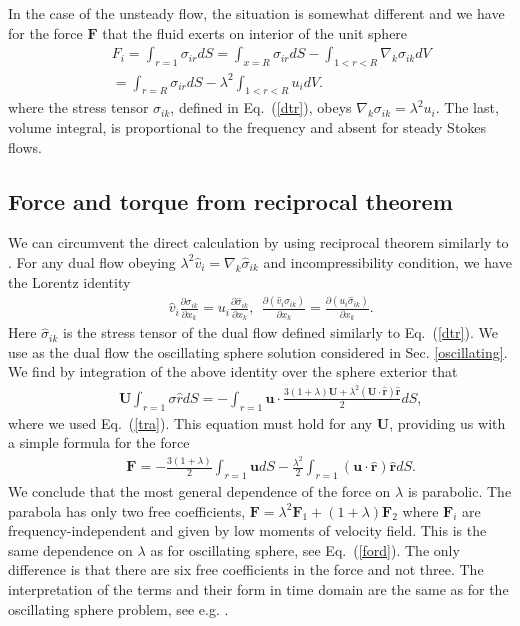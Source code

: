 \documentclass[aps,prx,twocolumn,amsmath,amssymb,amsfonts]{revtex4-2}
\begin{document}
{{\begin{appendices}
In the case of the unsteady flow, the situation is somewhat different and we have for the force $\bm F$ that the fluid exerts on interior of the unit sphere
\begin{eqnarray}&&
F_i=\int_{r=1} \sigma_{ir}dS=\int_{x=R} \sigma_{ir}dS-\int_{1<r<R} \nabla_k\sigma_{ik} dV
\nonumber\\&&
=\int_{r=R} \sigma_{ir}dS-\lambda^2 \int_{1<r<R}u_i dV. \label{fs0}
\end{eqnarray}
where the stress tensor $\sigma_{ik}$, defined in Eq.~(\ref{dtr}), obeys $\nabla_k\sigma_{ik}=\lambda^2u_i$. The last, volume integral, is proportional to the frequency and absent for steady Stokes flows.

\subsection{Force and torque from reciprocal theorem}

We can circumvent the direct calculation by using reciprocal theorem \cite{kim} similarly to \cite{for}. For any dual flow obeying $\lambda^2{\hat v}_i=\nabla_k{\hat \sigma}_{ik}$ and incompressibility condition, we have the Lorentz identity
\begin{eqnarray}&&\!\!\!\!\!\!\!\!\!\!\!\!\!
{\hat v}_i\frac{\partial \sigma_{ik}}{\partial x_k}\!=\!
u_i\frac{\partial {\hat \sigma}_{ik}}{\partial x_k},\ \ \frac{\partial ({\hat v}_i\sigma_{ik})}{\partial x_k}\!=\!
\frac{\partial (u_i{\hat \sigma}_{ik})}{\partial x_k}. \label{lorentz}
\end{eqnarray}
Here ${\hat \sigma}_{ik}$ is the stress tensor of the dual flow defined similarly to Eq.~(\ref{dtr}). We use as the dual flow the oscillating sphere solution considered in Sec. \ref{oscillating}. We find by integration of the above identity over the sphere exterior that
\begin{eqnarray}&&
\bm U\int_{r=1} \sigma{\hat r}dS=-\int_{r=1} \bm u\cdot \frac{3(1+\lambda)\bm U+\lambda^2 (\bm U\cdot \bm {\hat r})\bm {\hat r}}{2}dS,\nonumber
\end{eqnarray}
where we used Eq.~(\ref{tra}). This equation must hold for any $\bm U$, providing us with a simple formula for the force
\begin{eqnarray}&&\!\!\!\!\!\!
\bm F=-\frac{3(1+\lambda)}{2}\int_{r=1} \bm udS-\frac{\lambda^2}{2}\int_{r=1}  (\bm u\cdot \bm {\hat r})\bm {\hat r}dS. \label{sl}
\end{eqnarray}
We conclude that the most general dependence of the force on $\lambda$ is parabolic. The parabola has only two free coefficients, $\bm F=\lambda^2 \bm F_1+(1\!+\!\lambda)\bm F_2$ where $\bm F_i$ are frequency-independent and given by low moments of velocity field. This is the same dependence on $\lambda$ as for oscillating sphere, see Eq.~(\ref{ford}). The only difference is that there are six free coefficients in the force and not three. The interpretation of the terms and their form in time domain are the same as for the oscillating sphere problem, see e.g. \cite{LL,kim}.


\end{appendices}}}
\end{document}
